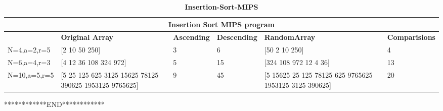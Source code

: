 \documentclass[english,a4paper,12pt]{article}
\begin{document}
\begin{table}[h!]
    \centering
    \begin{adjustbox}{width=1\textwidth}
    \begin{tabular}{| m{3cm} | m{5cm}| m{2cm}| m{2.5cm}|m{6cm}|m{3cm}|}
    \hline  
     \multicolumn{6}{|c|}{\textbf{Insertion Sort MIPS program}} \\
     \hline
     &  \textbf{Original Array} & \textbf{Ascending }  & \textbf{Descending } &   \textbf{RandomArray} & \textbf{Comparisions}\\ 
 \hline
 N=4,a=2,r=5 &  [2 10 50 250] & 3 & 6 & [50 2 10 250] & 4 \\
 \hline 
 N=6,a=4,r=3 & [4 12 36 108 324 972]& 5 & 15 & [324 108 972 12 4 36]& 13\\
 \hline 
 N=10,a=5,r=5 & [5 25 125 625 3125 15625 78125 390625 1953125 9765625]&9 & 45 &[5 15625 25 125 78125 625 9765625 1953125 3125 390625]& 20 \\
 \hline 

    \end{tabular}
    \end{adjustbox}
    \caption{\textbf{Insertion-Sort-MIPS}}
    \label{Insertion-Sort-MIPS}
\end{table}




************END************
\newpage    
\end{document}

